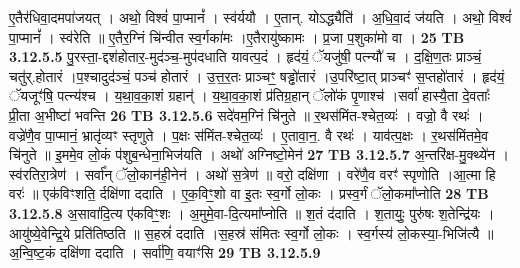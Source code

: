 \documentclass[17pt]{extarticle}
\begin{document}
{{{{{{{{{{{{{{{{{{{{{{{                  ए॒तैर॑धिवा॒दमपा॑जयत् । अथो॒ विश्वं॑ पा॒प्मानं᳚ । स्व॑र्ययौ । ए॒तान्. योऽद्ध्यैति॑ । अ॒धि॒वा॒दं ज॑यति । अथो॒ विश्वं॑ पा॒प्मानं᳚ । स्व॑रेति ॥ ए॒तैर॒ग्निं चि॑न्वीत स्व॒र्गका॑मः ।ए॒तैरायु॑ष्कामः । प्र॒जा प॒शुका॑मो वा । \textbf{ 25} \newline
                  \newline
                                \textbf{ TB 3.12.5.5} \newline
                  पु॒रस्ता॒-द्दश॑होतार॒-मुद॑ञ्च॒-मुप॑दधाति यावत्प॒दं । हृद॑यं॒ ॅयजु॑षी॒ पत्न्यौ॑ च । द॒क्षि॒ण॒तः प्राञ्चं॒ चतु॑र्.होतारं ।प॒श्चादुद॑ञ्चं॒ पञ्च॑ होतारं । उ॒त्त॒र॒तः प्राञ्चꣳ॒॒ षड्ढो॑तारं ।उ॒परि॑ष्टा॒त् प्राञ्चꣳ॑ स॒प्तहो॑तारं । हृद॑यं॒ ॅयजूꣳ॑षि॒ पत्न्य॑श्च । य॒था॒व॒का॒शं ग्रहान्॑ । य॒था॒व॒का॒शं प्र॑तिग्र॒हान् ॅलो॑कं पृ॒णाश्च॑ ।सर्वा॑ हास्यै॒ता दे॒वताः᳚ प्री॒ता अ॒भीष्टा॑ भवन्ति \textbf{ 26} \newline
                  \newline
                                \textbf{ TB 3.12.5.6} \newline
                  सदे॑वम॒ग्निं चि॑नुते ॥ र॒थस॑मिंत-श्चेत॒व्यः॑ । वज्रो॒ वै रथः॑ ।वज्रे॑णै॒व पा॒प्मानं॒ भ्रातृ॑व्यꣳ स्तृणुते । प॒क्षः स॑मिंत-श्चेत॒व्यः॑ । ए॒तावा॒न॒. वै रथः॑ । याव॑त्प॒क्षः । र॒थस॑मिंतमे॒व चि॑नुते ॥ इ॒ममे॒व लो॒कं प॑शुब॒न्धेना॒भिज॑यति । अथो॑ अग्निष्टो॒मेन॑ \textbf{ 27} \newline
                  \newline
                                \textbf{ TB 3.12.5.7} \newline
                  अ॒न्तरि॑क्ष-मु॒क्थ्ये॑न । स्व॑रतिरा॒त्रेण॑ । सर्वा᳚न् ॅलो॒कान॑ही॒नेन॑ । अथो॑ स॒त्रेण॑ ॥ वरो॒ दक्षि॑णा । वरे॑णै॒व वरꣳ॑ स्पृणोति ।आ॒त्मा हि वरः॑ ॥ एक॑विꣳशति॒ र्दक्षि॑णा ददाति । ए॒क॒विꣳ॒॒शो वा इ॒तः स्व॒र्गो लो॒कः । प्रस्व॒र्गं ॅलो॒कमा᳚प्नोति \textbf{ 28} \newline
                  \newline
                                \textbf{ TB 3.12.5.8} \newline
                  अ॒सावा॑दि॒त्य ए॑कविꣳ॒॒शः । अ॒मुमे॒वा-दि॒त्यमा᳚प्नोति ॥ श॒तं द॑दाति । श॒तायुः॒ पुरु॑षः श॒तेन्द्रि॑यः । आयु॑ष्ये॒वेन्द्रि॒ये प्रति॑तिष्ठति ॥ स॒हस्रं॑ ददाति ।स॒हस्र॑ संमितः स्व॒र्गो लो॒कः । स्व॒र्गस्य॑ लो॒कस्या॒-भिजि॑त्यै ॥ अ॒न्वि॒ष्ट॒कं दक्षि॑णा ददाति । सर्वा॑णि॒ वयाꣳ॑सि \textbf{ 29} \newline
                  \newline
                                \textbf{ TB 3.12.5.9} \newline
}}}}}}}}}}}}}}}}}}}}}}}
\end{document}
